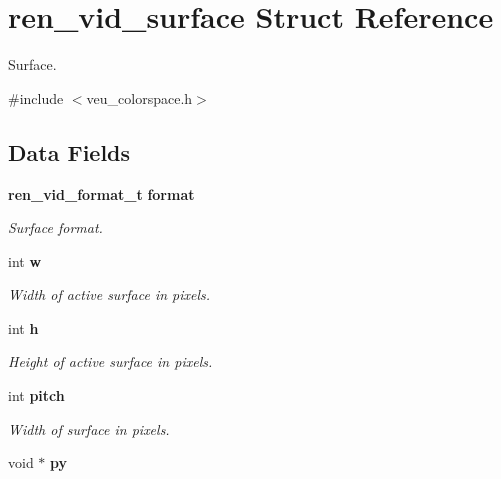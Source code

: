 \section{ren\_\-vid\_\-surface Struct Reference}
\label{structren__vid__surface}


Surface.  




{\ttfamily \#include $<$veu\_\-colorspace.h$>$}

\subsection*{Data Fields}
\begin{DoxyCompactItemize}
\item 
{\bf ren\_\-vid\_\-format\_\-t} {\bf format}\label{structren__vid__surface_a8e7a072220ff21ae63fafe8fcd4800e9}

\begin{DoxyCompactList}\small\item\em Surface format. \item\end{DoxyCompactList}\item 
int {\bf w}\label{structren__vid__surface_a5914aa588df3c6e501a41a1530905aae}

\begin{DoxyCompactList}\small\item\em Width of active surface in pixels. \item\end{DoxyCompactList}\item 
int {\bf h}\label{structren__vid__surface_a1aa46e32088db22c44aee9b3cec17a84}

\begin{DoxyCompactList}\small\item\em Height of active surface in pixels. \item\end{DoxyCompactList}\item 
int {\bf pitch}\label{structren__vid__surface_a8e42913432767986917ac7c85a18dd61}

\begin{DoxyCompactList}\small\item\em Width of surface in pixels. \item\end{DoxyCompactList}\item 
void $\ast$ {\bf py}\label{structren__vid__surface_a3b16e5d20f8d8ffc179834b64be13759}


\end{DoxyCompactItemize}
